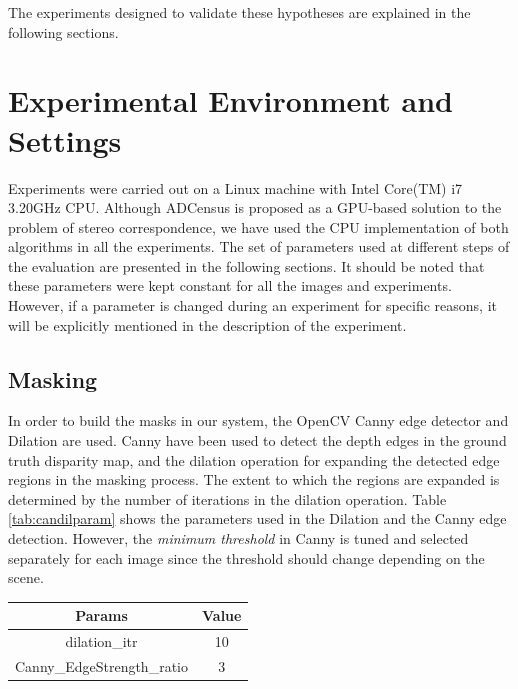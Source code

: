 The experiments designed to validate these hypotheses are explained in the following sections.

\section{Experimental Environment and Settings}
Experiments were carried out on a Linux machine with Intel Core(TM) i7 3.20GHz CPU. 
Although ADCensus is proposed as a GPU-based solution to the problem of stereo correspondence, 
we have used the CPU implementation of both algorithms in all the experiments.
The set of parameters used at different steps of the evaluation are presented in the following sections.
It should be noted that these parameters were kept constant for all the images and experiments. However, if a parameter is changed during an experiment for specific
reasons, it will be explicitly mentioned in the description of the experiment.

\subsection{Masking}
In order to build the masks in our system, the OpenCV Canny edge detector and Dilation are used.
Canny have been used to detect the depth edges in the ground truth disparity map, and the dilation operation 
for expanding the detected edge regions in the masking process. The extent to which the regions are expanded
is determined by the number of iterations in the dilation operation. Table \ref{tab:candilparam} shows the parameters used in the Dilation
and the Canny edge detection. However, the \textit{minimum threshold} in Canny is tuned and selected separately for each image 
since the threshold should change depending on the scene.

{\footnotesize
\begin{minipage}{\linewidth}
\begin{center}
\label{tab:candilparam}
\begin{tabular}{ |c|c| }
\hline
\textbf{Params} & \textbf{Value} \\ \hline
dilation\_itr & 10 \\  \hline
Canny\_EdgeStrength\_ratio & 3 \\ \hline
\end{tabular}
\end{center}
\end{minipage} \newline
}

